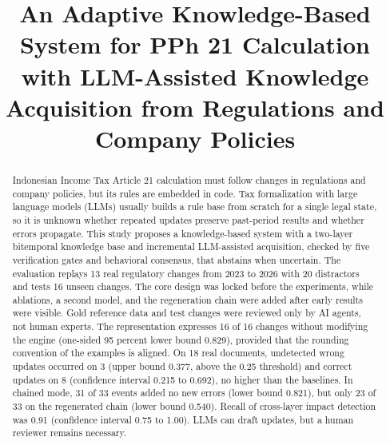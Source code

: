 \documentclass[conference]{IEEEtran}
\begin{document}

\title{An Adaptive Knowledge-Based System for PPh 21 Calculation with LLM-Assisted Knowledge Acquisition from Regulations and Company Policies}

\author{
\and
{}
}

\maketitle

\begin{abstract}
Indonesian Income Tax Article 21 calculation must follow changes in regulations and company policies, but its rules are embedded in code. Tax formalization with large language models (LLMs) usually builds a rule base from scratch for a single legal state, so it is unknown whether repeated updates preserve past-period results and whether errors propagate. This study proposes a knowledge-based system with a two-layer bitemporal knowledge base and incremental LLM-assisted acquisition, checked by five verification gates and behavioral consensus, that abstains when uncertain. The evaluation replays 13 real regulatory changes from 2023 to 2026 with 20 distractors and tests 16 unseen changes. The core design was locked before the experiments, while ablations, a second model, and the regeneration chain were added after early results were visible. Gold reference data and test changes were reviewed only by AI agents, not human experts. The representation expresses 16 of 16 changes without modifying the engine (one-sided 95 percent lower bound 0.829), provided that the rounding convention of the examples is aligned. On 18 real documents, undetected wrong updates occurred on 3 (upper bound 0.377, above the 0.25 threshold) and correct updates on 8 (confidence interval 0.215 to 0.692), no higher than the baselines. In chained mode, 31 of 33 events added no new errors (lower bound 0.821), but only 23 of 33 on the regenerated chain (lower bound 0.540). Recall of cross-layer impact detection was 0.91 (confidence interval 0.75 to 1.00). LLMs can draft updates, but a human reviewer remains necessary.
\end{abstract}
\end{document}
